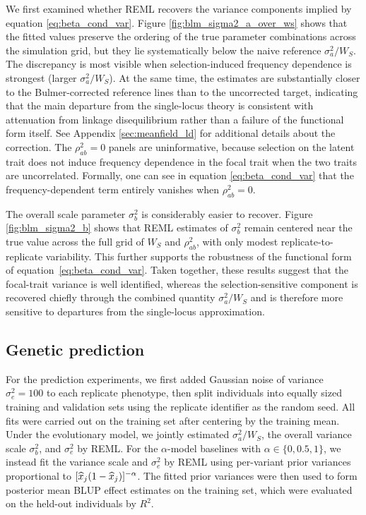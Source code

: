 \documentclass[10pt]{article}
\begin{document}
We first examined whether REML recovers the variance components implied by equation \eqref{eq:beta_cond_var}. 
Figure \ref{fig:blm_sigma2_a_over_ws} shows that the fitted values preserve the ordering of the true parameter combinations across the simulation grid, but they lie systematically below the naive reference $\sigma_a^2 / W_S$. 
The discrepancy is most visible when selection-induced frequency dependence is strongest (larger $\sigma_a^2 /W_S$). 
At the same time, the estimates are substantially closer to the Bulmer-corrected reference lines than to the uncorrected target, 
indicating that the main departure from the single-locus theory is consistent with attenuation from linkage disequilibrium rather than a failure of the functional form itself. 
See Appendix \ref{sec:meanfield_ld} for additional details about the correction.
The $\rho_{ab}^2=0$ panels are uninformative, because selection on the latent trait does not induce frequency dependence in the focal trait when the two traits are uncorrelated.
Formally, one can see in equation \eqref{eq:beta_cond_var} that the frequency-dependent term entirely vanishes when $\rho_{ab}^2=0$.

The overall scale parameter $\sigma_b^2$ is considerably easier to recover. Figure \ref{fig:blm_sigma2_b} shows that REML estimates of $\sigma_b^2$ remain centered near the true value across the full grid of $W_S$ and $\rho_{ab}^2$, with only modest replicate-to-replicate variability. 
This further supports the robustness of the functional form of equation~\eqref{eq:beta_cond_var}.
Taken together, these results suggest that the focal-trait variance is well identified,
whereas the selection-sensitive component is recovered chiefly through the combined quantity $\sigma_a^2 / W_S$ and is therefore more sensitive to departures from the single-locus approximation.

\subsection{Genetic prediction}

For the prediction experiments, we first added Gaussian noise of variance $\sigma_e^2=100$ to each replicate phenotype, 
then split individuals into equally sized training and validation sets using the replicate identifier as the random seed.
All fits were carried out on the training set after centering by the training mean. Under the evolutionary model, 
we jointly estimated $\sigma_a^2/W_S$, the overall variance scale $\sigma_b^2$, and $\sigma_e^2$ by REML. 
For the $\alpha$-model baselines with $\alpha \in \{0, 0.5, 1\}$, we instead fit the variance scale and $\sigma_e^2$ by REML using per-variant prior variances proportional to $[\widehat{x}_j(1-\widehat{x}_j)]^{-\alpha}$.
The fitted prior variances were then used to form posterior mean BLUP effect estimates on the training set, which were evaluated on the held-out individuals by $R^2$.
\end{document}
